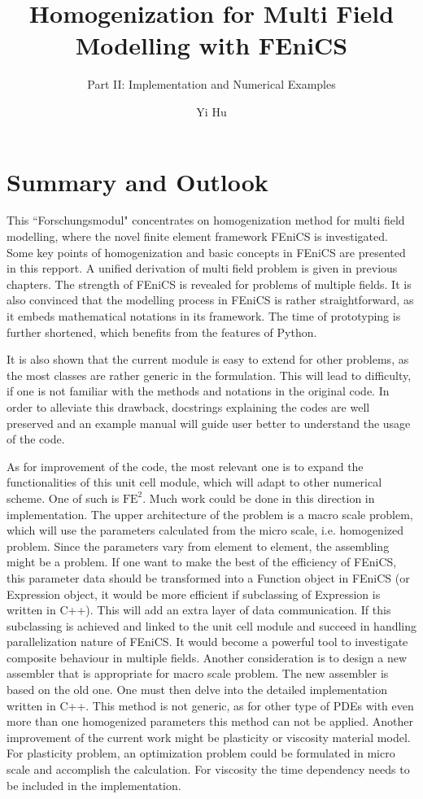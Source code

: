 \documentclass[10pt,a4paper]{scrreprt}
\author{Yi Hu}
\title{Homogenization for Multi Field Modelling with FEniCS}
\subtitle{Part II: Implementation and Numerical Examples}
\begin{document}
\chapter{Summary and Outlook}
This ``Forschungsmodul" concentrates on homogenization method for multi field modelling, where the novel finite element framework FEniCS is investigated. Some key points of homogenization and basic concepts in FEniCS are presented in this repport. A unified derivation of multi field problem is given in previous chapters. The strength of FEniCS is revealed for problems of multiple fields. It is also convinced that the modelling process in FEniCS is rather straightforward, as it embeds mathematical notations in its framework. The time of prototyping is further shortened, which benefits from the features of Python.

It is also shown that the current module is easy to extend for other problems, as the most classes are rather generic in the formulation. This will lead to difficulty, if one is not familiar with the methods and notations in the original code. In order to alleviate this drawback, docstrings explaining the codes are well preserved and an example manual will guide user better to understand the usage of the code.

As for improvement of the code, the most relevant one is to expand the functionalities of this unit cell module, which will adapt to other numerical scheme. One of such is $\text{FE}^{2}$. Much work could be done in this direction in implementation. The upper architecture of the problem is a macro scale problem, which will use the parameters calculated from the micro scale, i.e. homogenized problem. Since the parameters vary from element to element, the assembling might be a problem. If one want to make the best of the efficiency of FEniCS, this parameter data should be transformed into a Function object in FEniCS (or Expression object, it would be more efficient if subclassing of Expression is written in C++). This will add an extra layer of data communication. If this subclassing is achieved and linked to the unit cell module and succeed in handling parallelization nature of FEniCS. It would become a powerful tool to investigate composite behaviour in multiple fields. Another consideration is to design a new assembler that is appropriate for macro scale problem. The new assembler is based on the old one. One must then delve into the detailed implementation written in C++. This method is not generic, as for other type of PDEs with even more than one homogenized parameters this method can not be applied. Another improvement of the current work might be plasticity or viscosity material model. For plasticity problem, an optimization problem could be formulated in micro scale and accomplish the calculation. For viscosity the time dependency needs to be included in the implementation.
\end{document}

